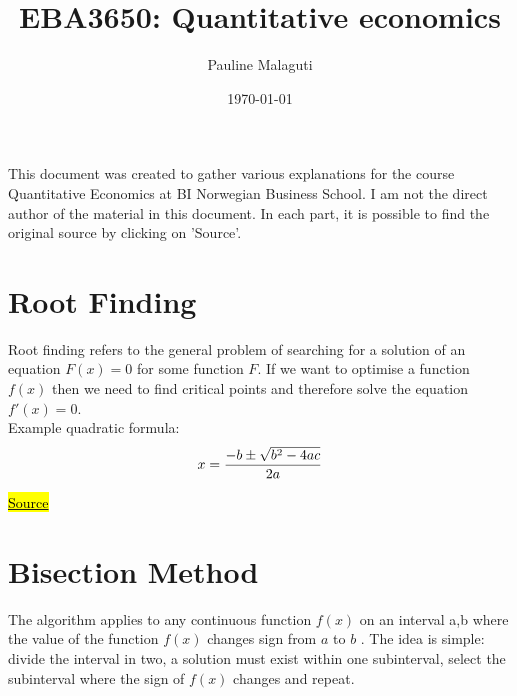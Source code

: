 \documentclass[a4paper, 12pt, reqno]{article}
\title{EBA3650: Quantitative economics}
\date{\today}
\author{Pauline Malaguti}
\begin{document}
\maketitle
This document was created to gather various explanations for the course Quantitative Economics at BI Norwegian Business School. 
I am not the direct author of the material in this document.
In each part, it is possible to find the original source by clicking on 'Source'. 

\tableofcontents

\newpage
\section{Root Finding}
Root finding refers to the general problem of searching for a solution of an equation $F(x) = 0$  for some function $F$.  
If we want to optimise a function $f(x)$ then we need to find critical points and therefore solve the equation  $f'(x)= 0$. \\
Example quadratic formula: \\
\begin{equation}
x = \frac{-b \pm \sqrt{b^2 - 4ac}}{2a}
\notag
\end{equation}

\href{https://personal.math.ubc.ca/~pwalls/math-python/roots-optimization/root-finding/}{\hl{Source}}

\section{Bisection Method}
The algorithm applies to any continuous function $f(x)$ on an interval a,b where the value of the function $f(x)$ changes sign from $a$ to $b$ . The idea is simple: divide the interval in two, a solution must exist within one subinterval, select the subinterval where the sign of $f(x)$ changes and repeat. \\
\end{document}

